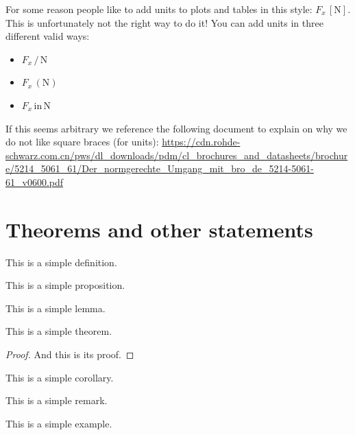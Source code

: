 For some reason people like to add units to plots and tables in this style: $ F_x \, [\si{\newton}] $.
This is unfortunately not the right way to do it! You can add units in three different valid ways:
\begin{itemize}
	\item $ F_x \,/ \,\si{\newton} $
	\item $ F_x \, (\si{\newton}) $
	\item $ F_x \, \text{in}\, \si{\newton} $
\end{itemize}
If this seems arbitrary we reference the following document to explain on why we do not like square braces (for units):
\url{https://cdn.rohde-schwarz.com.cn/pws/dl_downloads/pdm/cl_brochures_and_datasheets/brochure/5214_5061_61/Der_normgerechte_Umgang_mit_bro_de_5214-5061-61_v0600.pdf}




\section{Theorems and other statements}
\begin{dfn}
  This is a simple definition.
\end{dfn}

\begin{prp}
  This is a simple proposition.
\end{prp}

\begin{lem}
  This is a simple lemma.
\end{lem}

\begin{thm}
  This is a simple theorem.
\end{thm}
\begin{proof}
  And this is its proof.
\end{proof}

\begin{cor}
  This is a simple corollary.
\end{cor}

\begin{rem}
  This is a simple remark.
\end{rem}

\begin{exa}
  This is a simple example.
\end{exa}


